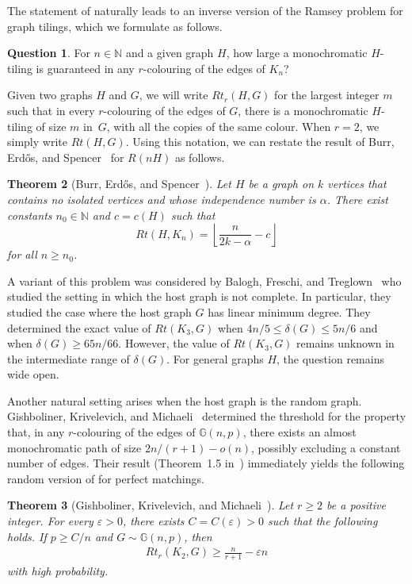 \documentclass[a4paper,reqno,11pt]{amsart}
\newtheorem{theorem}{Theorem}[section]
\theoremstyle{definition}
\newtheorem{question}[theorem]{Question}
\theoremstyle{remark}
\renewcommand\leq{\leqslant}
\renewcommand\geq{\geqslant}
\renewcommand\le{\leqslant}
\renewcommand\ge{\geqslant}
\begin{document}
The statement of  naturally leads to an inverse version of the Ramsey problem for graph tilings, which we formulate as follows.

\begin{question}\label{question1}
For $n \in \mathbb{N}$ and a given graph $H$, how large a monochromatic $H$-tiling is guaranteed in any $r$-colouring of the edges of $K_n$?
\end{question}

Given two graphs $H$ and $G$, we will write $Rt_r(H,G)$ for the largest integer $m$ such that in every $r$-colouring of the edges of $G$, there is a monochromatic $H$-tiling of size $m$ in~$G$, with all the copies of the same colour. When $r=2$, we simply write $Rt(H,G)$. Using this notation, we can restate the result of Burr, Erd\H{o}s, and Spencer~\cite{BES} for $R(nH)$ as follows.

\begin{theorem}[Burr, Erd\H{o}s, and Spencer~\cite{BES}]\label{thm:BES}
    Let $H$ be a graph on $k$ vertices that contains no isolated vertices and whose independence number is $\alpha$. There exist constants $n_0 \in \mathbb{N}$ and $c=c(H)$ such that
\begin{equation*}
Rt(H,K_n) = \left\lfloor{\frac{n}{2k - \alpha} -c}\right\rfloor    \end{equation*}
for all $n \ge n_0$.
\end{theorem}

A variant of this problem was considered by Balogh, Freschi, and Treglown~\cite{BFT} who studied the setting in which the host graph is not complete. In particular, they studied the case where the host graph $G$ has linear minimum degree. They determined the exact value of $Rt(K_3, G)$ when $4n/5\leq\delta(G) \le {5n}/{6}$ and when $\delta(G) \ge {65n}/{66}$. However, the value of $Rt(K_3, G)$ remains unknown in the intermediate range of $\delta(G)$. For general graphs $H$, the question remains wide open.

Another natural setting arises when the host graph is the random graph. Gishboliner, Krivelevich, and Michaeli~\cite{GKM} determined the threshold for the property that, in any $r$-colouring of the edges of $\mathbb{G}(n,p)$, there exists an almost monochromatic path of size $2n/(r+1)-o(n)$, possibly excluding a constant number of edges. Their result (Theorem~1.5 in~\cite{GKM}) immediately yields the following random version of  for perfect matchings.

\begin{theorem}[Gishboliner, Krivelevich, and Michaeli~\cite{GKM}]\label{thm:MatchingLower}
Let $r \ge 2$ be a positive integer. For every $\varepsilon>0$, there exists $C=C(\varepsilon)>0$ such that the following holds. If $p\geq C/n$ and $G\sim \mathbb{G}(n,p)$, then
\begin{align*}
 Rt_r(K_2,G)\geq \frac{n}{r+1}-\varepsilon n  
\end{align*}
with high probability.
\end{theorem}
\end{document}
